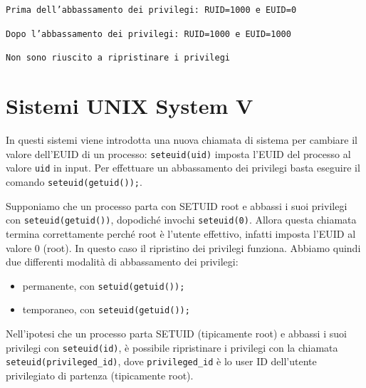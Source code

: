 \texttt{Prima dell’abbassamento dei privilegi:
 RUID=1000 e EUID=0}
 
 \texttt{Dopo l’abbassamento dei privilegi:
 RUID=1000 e EUID=1000}
 
 \texttt{Non sono riuscito a ripristinare i
privilegi}

\section{Sistemi UNIX System V}
In questi sistemi viene introdotta una nuova chiamata di sistema per cambiare il valore dell'EUID di un processo: \texttt{seteuid(uid)} imposta l'EUID del processo al valore \texttt{uid} in input. Per effettuare un abbassamento dei privilegi basta eseguire il comando \texttt{seteuid(getuid());}.

Supponiamo che un processo parta con SETUID root e abbassi i suoi privilegi con \texttt{seteuid(getuid())}, dopodiché invochi \texttt{seteuid(0)}. Allora questa chiamata termina correttamente perché root è l'utente effettivo, infatti imposta l'EUID al valore 0 (root). In questo caso il ripristino dei privilegi funziona. Abbiamo quindi due differenti modalità di abbassamento dei privilegi:
\begin{itemize}
    \item permanente, con \texttt{setuid(getuid());}
    \item temporaneo, con \texttt{seteuid(getuid());}
\end{itemize}
Nell'ipotesi che un processo parta SETUID (tipicamente root) e abbassi i suoi privilegi con \texttt{seteuid(id)}, è possibile ripristinare i privilegi con la chiamata \texttt{seteuid(privileged\_id)}, dove \texttt{privileged\_id} è lo user ID dell'utente privilegiato di partenza (tipicamente root).

